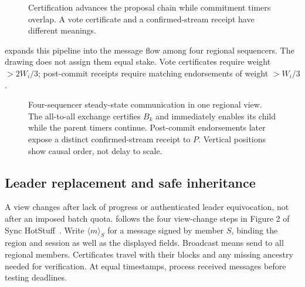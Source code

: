 \documentclass[11pt,a4paper,onecolumn]{article}
\begin{document}
\begin{figure}[H]\centering

\caption{Certification advances the proposal chain while commitment timers
overlap. A vote certificate and a confirmed-stream receipt have different meanings.}
\label{fig:pipeline}
\end{figure}

 expands this pipeline into the message flow
among four regional sequencers. The drawing does not assign them equal stake.
Vote certificates require weight $>2W_i/3$; post-commit receipts require
matching endorsements of weight $>W_i/3$.

\begin{figure}[H]\centering

\caption{Four-sequencer steady-state communication in one regional view.
The all-to-all exchange certifies $B_k$ and immediately enables its child while
the parent timers continue. Post-commit endorsements later expose a distinct
confirmed-stream receipt to $P$. Vertical positions show causal order, not
delay to scale.}
\label{fig:pipeline-communication}
\end{figure}

\subsection{Leader replacement and safe inheritance}
A view changes after lack of progress or authenticated leader equivocation,
not after an imposed batch quota.  follows the four
view-change steps in Figure 2 of Sync HotStuff~\cite{synchotstuff}.
Write $\langle m\rangle_S$ for a message signed by member $S$, binding the
region and session as well as the displayed fields. Broadcast means send to
all regional members. Certificates travel with their blocks and any missing
ancestry needed for verification. At equal timestamps, process received
messages before testing deadlines.
\end{document}
